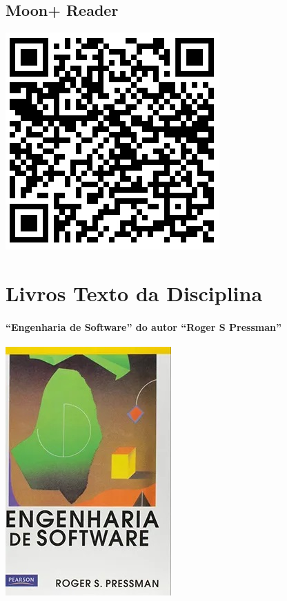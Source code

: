 \documentclass[
]{book}
\begin{document}
\section{\texorpdfstring{\textbf{Moon+ Reader}}{Moon+ Reader}}\label{moon-reader}

\includegraphics{images/qrcode/leitor_epub/MoonReaderPlus.jpg}

\chapter{Livros Texto da Disciplina}\label{livros-texto-da-disciplina}

\subsubsection{``Engenharia de Software'' do autor ``Roger S Pressman''}\label{engenharia-de-software-do-autor-roger-s-pressman}

\includegraphics{images/livros/engenharia_software_pressman.jpg}
\end{document}
